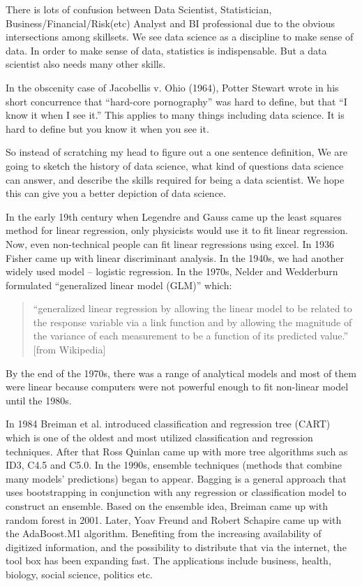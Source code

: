 \documentclass[]{book}
\theoremstyle{definition}
\theoremstyle{definition}
\theoremstyle{remark}
\begin{document}
There is lots of confusion between Data Scientist, Statistician,
Business/Financial/Risk(etc) Analyst and BI professional due to the
obvious intersections among skillsets. We see data science as a
discipline to make sense of data. In order to make sense of data,
statistics is indispensable. But a data scientist also needs many other
skills.

In the obscenity case of Jacobellis v. Ohio (1964), Potter Stewart wrote
in his short concurrence that ``hard-core pornography'' was hard to
define, but that ``I know it when I see it.'' This applies to many
things including data science. It is hard to define but you know it when
you see it.

So instead of scratching my head to figure out a one sentence
definition, We are going to sketch the history of data science, what
kind of questions data science can answer, and describe the skills
required for being a data scientist. We hope this can give you a better
depiction of data science.

In the early 19th century when Legendre and Gauss came up the least
squares method for linear regression, only physicists would use it to
fit linear regression. Now, even non-technical people can fit linear
regressions using excel. In 1936 Fisher came up with linear discriminant
analysis. In the 1940s, we had another widely used model -- logistic
regression. In the 1970s, Nelder and Wedderburn formulated ``generalized
linear model (GLM)'' which:

\begin{quote}
``generalized linear regression by allowing the linear model to be
related to the response variable via a link function and by allowing the
magnitude of the variance of each measurement to be a function of its
predicted value.'' {[}from Wikipedia{]}
\end{quote}

By the end of the 1970s, there was a range of analytical models and most
of them were linear because computers were not powerful enough to fit
non-linear model until the 1980s.

In 1984 Breiman et al. introduced classification and regression tree
(CART) which is one of the oldest and most utilized classification and
regression techniques. After that Ross Quinlan came up with more tree
algorithms such as ID3, C4.5 and C5.0. In the 1990s, ensemble techniques
(methods that combine many models' predictions) began to appear. Bagging
is a general approach that uses bootstrapping in conjunction with any
regression or classification model to construct an ensemble. Based on
the ensemble idea, Breiman came up with random forest in 2001. Later,
Yoav Freund and Robert Schapire came up with the AdaBoost.M1 algorithm.
Benefiting from the increasing availability of digitized information,
and the possibility to distribute that via the internet, the tool box
has been expanding fast. The applications include business, health,
biology, social science, politics etc.
\end{document}
